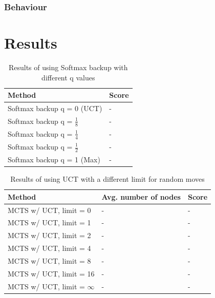 \documentclass[10pt,a4paper]{article}
\begin{document}
\subsubsection{Behaviour}

\clearpage

\section{Results}
\renewcommand{\arraystretch}{1.5}
\begin{table}[h]
	\centering
	\begin{tabular}{| l | l |}
		\hline
		\textbf{Method} & \textbf{Score} 		\\ \hline
		Softmax backup q = 0 (UCT) 			& - \\ \hline
		Softmax backup q = $\frac{1}{8}$	& - \\ \hline
		Softmax backup q = $\frac{1}{4}$	& - \\ \hline
		Softmax backup q = $\frac{1}{2}$	& - \\ \hline
		Softmax backup q = 1 (Max)			& - \\ \hline
	\end{tabular}
	\caption{Results of using Softmax backup with different q values}
	\label{tab:softmax_results}
\end{table}

\begin{table}[h]
	\centering
	\begin{tabular}{| l | l | l |}
		\hline
		\textbf{Method} & \textbf{Avg. number of nodes} & \textbf{Score} \\ \hline
		MCTS w/ UCT, limit = 0			& - & - \\ \hline
		MCTS w/ UCT, limit = 1			& - & - \\ \hline
		MCTS w/ UCT, limit = 2			& - & - \\ \hline
		MCTS w/ UCT, limit = 4			& - & - \\ \hline
		MCTS w/ UCT, limit = 8			& - & - \\ \hline
		MCTS w/ UCT, limit = 16			& - & - \\ \hline
		MCTS w/ UCT, limit = $\infty$	& - & - \\ \hline
	\end{tabular}
	\caption{Results of using UCT with a different limit for random moves}
	\label{tab:uct_results}
\end{table}
\end{document}
